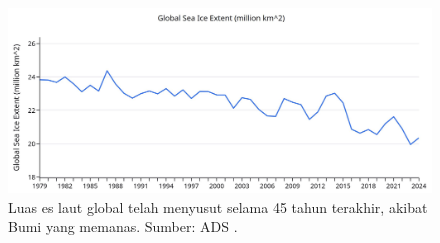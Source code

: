 \documentclass[10pt,twocolumn,letterpaper]{article}
\begin{document}
\begin{figure}[t]
\begin{center}
\includegraphics[width=1\textwidth]{ice.jpg}
\end{center}

   \caption{Luas es laut global telah menyusut selama 45 tahun terakhir, akibat Bumi yang memanas. Sumber: ADS \cite{149}.}
\label{fig:24}
\end{figure}

\clearpage
\twocolumn

{\small
\renewcommand{\refname}{References}


}
\end{document}
